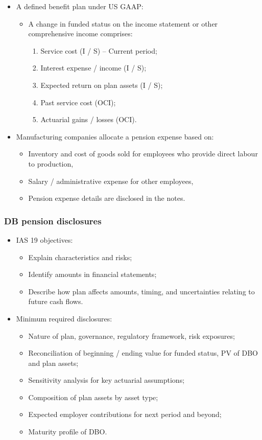 \documentclass[../notes_compiled.tex]{subfiles}
\begin{document}
\begin{itemize}
\item A defined benefit plan under US GAAP:
\begin{itemize}
\item A change in funded status on the income statement or other comprehensive income comprises:
\begin{enumerate}
\item Service cost (I / S) -- Current period;
\item Interest expense / income (I / S);
\item Expected return on plan assets (I / S);
\item Past service cost (OCI);
\item Actuarial gains / losses (OCI).
\end{enumerate}
\end{itemize}
\item Manufacturing companies allocate a pension expense based on:
\begin{itemize}
\item Inventory and cost of goods sold for employees who provide direct labour to production,
\item Salary / administrative expense for other employees,
\item Pension expense details are disclosed in the notes.
\end{itemize}
\end{itemize}

\subsubsection{DB pension disclosures}
\begin{itemize}
\item IAS 19 objectives:
\begin{itemize}
\item Explain characteristics and risks;
\item Identify amounts in financial statements;
\item Describe how plan affects amounts, timing, and uncertainties relating to future cash flows.
\end{itemize}
\item Minimum required disclosures:
\begin{itemize}
\item Nature of plan, governance, regulatory framework, risk exposures;
\item Reconciliation of beginning / ending value for funded status, PV of DBO and plan assets;
\item Sensitivity analysis for key actuarial assumptions;
\item Composition of plan assets by asset type;
\item Expected employer contributions for next period and beyond;
\item Maturity profile of DBO.
\end{itemize}

\end{itemize}
\end{document}
